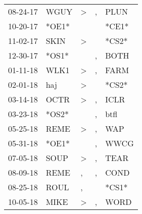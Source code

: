 \begin{supertabular}{p{0.07\textwidth}p{0.06\textwidth}p{0.02\textwidth}p{0.02\textwidth}p{0.06\textwidth}}
          08-24-17\textsuperscript{} &           WGUY\textsuperscript{} &     \textgreater &                , &           PLUN\textsuperscript{} \\
          10-20-17\textsuperscript{} &                            *OE1* &                  &                  &                            *CE1* \\
          11-02-17\textsuperscript{} &           SKIN\textsuperscript{} &     \textgreater &                  &                            *CS2* \\
          12-30-17\textsuperscript{} &                            *OS1* &                  &                , &           BOTH\textsuperscript{} \\
          01-11-18\textsuperscript{} &           WLK1\textsuperscript{} &     \textgreater &                , &           FARM\textsuperscript{} \\
          02-01-18\textsuperscript{} &            haj\textsuperscript{} &     \textgreater &                  &                            *CS2* \\
          03-14-18\textsuperscript{} &           OCTR\textsuperscript{} &     \textgreater &                , &           ICLR\textsuperscript{} \\
          03-23-18\textsuperscript{} &                            *OS2* &                  &                , &           btfl\textsuperscript{} \\
          05-25-18\textsuperscript{} &           REME\textsuperscript{} &     \textgreater &                , &            WAP\textsuperscript{} \\
          05-31-18\textsuperscript{} &                            *OE1* &                  &                , &           WWCG\textsuperscript{} \\
          07-05-18\textsuperscript{} &           SOUP\textsuperscript{} &     \textgreater &                , &           TEAR\textsuperscript{} \\
          08-09-18\textsuperscript{} &           REME\textsuperscript{} &                , &                , &           COND\textsuperscript{} \\
          08-25-18\textsuperscript{} &           ROUL\textsuperscript{} &                , &                  &                            *CS1* \\
          10-05-18\textsuperscript{} &           MIKE\textsuperscript{} &     \textgreater &                , &           WORD\textsuperscript{} \\

\end{supertabular}
